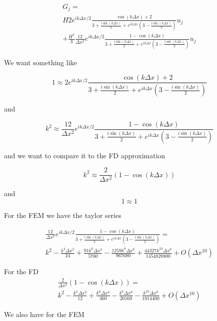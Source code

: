 \documentclass[12pt]{article}
\begin{document}
\begin{multline}
G_j = \\ H2 e^{ ik\Delta x/2} \frac{\cos \left(k\Delta x\right) + 2}{3   + \frac{i\sin\left(k\Delta x\right)}{2} + e^{ik\Delta x}\left(3   - \frac{i\sin\left(k\Delta x\right)}{2}\right)} u_{j}  \\+ \frac{H^3}{3} \frac{12}{\Delta x^2} e^{ ik\Delta x/2}\frac{ 1 -  \cos \left(k\Delta x\right)}{3   + \frac{i\sin\left(k\Delta x\right)}{2} + e^{ik\Delta x}\left(3   - \frac{i\sin\left(k\Delta x\right)}{2}\right)} u_{j}
\end{multline}

We want something like

\[1 \approx 2e^{ ik\Delta x/2} \frac{\cos \left(k\Delta x\right) + 2}{3   + \frac{i\sin\left(k\Delta x\right)}{2} + e^{ik\Delta x}\left(3   - \frac{i\sin\left(k\Delta x\right)}{2}\right)}\]

and 

\[k^2 \approx  \frac{12}{\Delta x^2} e^{ ik\Delta x/2}\frac{ 1 -  \cos \left(k\Delta x\right)}{3   + \frac{i\sin\left(k\Delta x\right)}{2} + e^{ik\Delta x}\left(3   - \frac{i\sin\left(k\Delta x\right)}{2}\right)}\]

and we want to compare it to the FD approximation

\[k^2 \approx  \frac{2}{\Delta x^2}\left(1  -\cos\left(k \Delta x\right)\right)\]

and 
\[1 \approx 1\]

For the FEM we have the taylor series

\begin{multline}
 \frac{12}{\Delta x^2} e^{ ik\Delta x/2}\frac{ 1 -  \cos \left(k\Delta x\right)}{3   + \frac{i\sin\left(k\Delta x\right)}{2} + e^{ik\Delta x}\left(3   - \frac{i\sin\left(k\Delta x\right)}{2}\right)} = \\ k^2 - \frac{k^4 \Delta x^2}{24} + \frac{91k^6 \Delta x^4}{5760} - \frac{1259k^{8} \Delta x^{6}}{967680} + \frac{44327k^{10} \Delta x^{8}}{1454828800} + O(\Delta x^{10})
\end{multline}


For the FD
\begin{multline}
\frac{2}{\Delta x^2}\left(1  -\cos\left(k \Delta x\right)\right) = \\ k^2 - \frac{k^4 \Delta x^2}{12} + \frac{k^6 \Delta x^4}{360} - \frac{k^8 \Delta x^6}{20160} - \frac{k^{10} \Delta x^{8}}{1814400} + O(\Delta x^{10})
\end{multline}


We also have for the FEM
\end{document}
